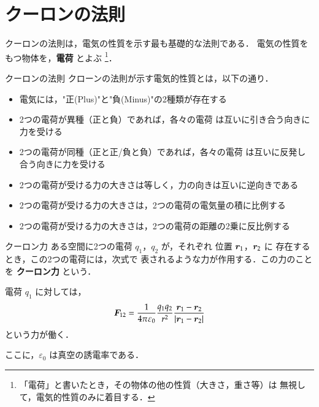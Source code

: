 ﻿%
    \section{クーロンの法則}
        クーロンの法則は，電気の性質を示す最も基礎的な法則である．
        電気の性質をもつ物体を，\textbf{電荷} とよぶ
            \footnote{
                「電荷」と書いたとき，その物体の他の性質（大きさ，重さ等）は
                無視して，電気的性質のみに着目する．
            }．
        \begin{myshadebox}{クーロンの法則}
            クローンの法則が示す電気的性質とは，以下の通り．
            \begin{itemize}
                \item   電気には，"正(Plus)"と"負(Minus)"の2種類が存在する
                \item   2つの電荷が異種（正と負）であれば，各々の電荷
                      は互いに引き合う向きに力を受ける
                \item   2つの電荷が同種（正と正/負と負）であれば，各々の電荷
                      は互いに反発し合う向きに力を受ける
                \item   2つの電荷が受ける力の大きさは等しく，力の向きは互いに逆向きである
                \item   2つの電荷が受ける力の大きさは，2つの電荷の電気量の積に比例する
                \item   2つの電荷が受ける力の大きさは，2つの電荷の距離の2乗に反比例する
            \end{itemize}
        \end{myshadebox}
        \begin{myshadebox}{クーロン力}
            ある空間に2つの電荷 $q_{1}$，$q_{2}$ が，それぞれ
            位置 $\boldsymbol{r}_{1}$，$\boldsymbol{r}_{2}$ に
            存在するとき，この2つの電荷には，次式で
            表されるような力が作用する．この力のこと
            を \textbf{クーロン力} という．

            電荷 $q_{1}$ に対しては，
               \begin{align}
                   \boldsymbol{F}_{12} =
                       \frac{1}{4\pi\varepsilon_{0}} \frac{q_{1}q_{2}}{r^{2}}
                           \frac{\boldsymbol{r}_{1} - \boldsymbol{r}_{2}}{|\boldsymbol{r}_{1} - \boldsymbol{r}_{2}|}
               \end{align}
            という力が働く．

            ここに，$\varepsilon_{0}$ は真空の誘電率である．
        \end{myshadebox}

